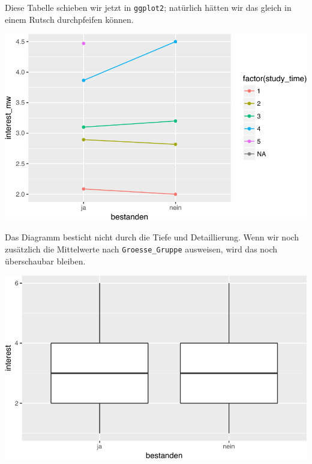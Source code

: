 \documentclass[12pt,ngerman,]{book}
\newenvironment{Shaded}{\begin{snugshade}}{\end{snugshade}}
\newcommand{\KeywordTok}[1]{\textcolor[rgb]{0.13,0.29,0.53}{\textbf{{#1}}}}
\newcommand{\DataTypeTok}[1]{\textcolor[rgb]{0.13,0.29,0.53}{{#1}}}
\newcommand{\StringTok}[1]{\textcolor[rgb]{0.31,0.60,0.02}{{#1}}}
\newcommand{\NormalTok}[1]{{#1}}
\renewenvironment{Shaded}{\begin{kframe}}{\end{kframe}}
\begin{document}
Diese Tabelle schieben wir jetzt in \texttt{ggplot2}; natürlich hätten
wir das gleich in einem Rutsch durchpfeifen können.

\begin{Shaded}
\end{Shaded}

\begin{center}\includegraphics[width=0.7\linewidth]{050_Daten_visualisieren_files/figure-latex/unnamed-chunk-24-1} \end{center}

Das Diagramm besticht nicht durch die Tiefe und Detaillierung. Wenn wir
noch zusätzlich die Mittelwerte nach \texttt{Groesse\_Gruppe} ausweisen,
wird das noch überschaubar bleiben.

\begin{Shaded}
\end{Shaded}

\begin{center}\includegraphics[width=0.7\linewidth]{050_Daten_visualisieren_files/figure-latex/unnamed-chunk-25-1} \end{center}
\end{document}
